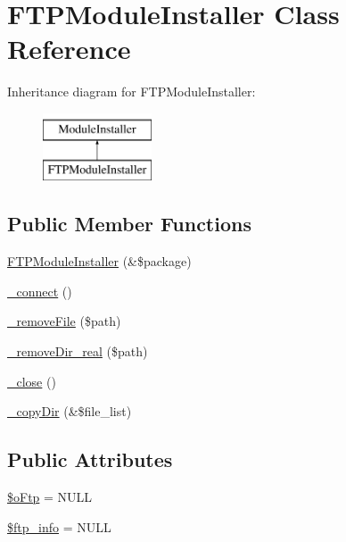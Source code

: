 \hypertarget{classFTPModuleInstaller}{\section{F\-T\-P\-Module\-Installer Class Reference}
\label{classFTPModuleInstaller}
}
Inheritance diagram for F\-T\-P\-Module\-Installer\-:\begin{figure}[H]
\begin{center}
\leavevmode
\includegraphics[height=2.000000cm]{classFTPModuleInstaller}
\end{center}
\end{figure}
\subsection*{Public Member Functions}
\begin{DoxyCompactItemize}
\item 
\hyperlink{classFTPModuleInstaller_a77174bd1ad449c30c7f74333921441d6}{F\-T\-P\-Module\-Installer} (\&\$package)
\item 
\hyperlink{classFTPModuleInstaller_af6dd02408c44cc5e3903e7a8d195314b}{\-\_\-connect} ()
\item 
\hyperlink{classFTPModuleInstaller_a97578f8c7903aded9a0141b1d378713b}{\-\_\-remove\-File} (\$path)
\item 
\hyperlink{classFTPModuleInstaller_a069e2b098a7b06dfcf65bedf41c0fa0c}{\-\_\-remove\-Dir\-\_\-real} (\$path)
\item 
\hyperlink{classFTPModuleInstaller_a283ea106c86af1ab83e97ae852d07f57}{\-\_\-close} ()
\item 
\hyperlink{classFTPModuleInstaller_a48e7b724a4daa35a71163855add13532}{\-\_\-copy\-Dir} (\&\$file\-\_\-list)
\end{DoxyCompactItemize}
\subsection*{Public Attributes}
\begin{DoxyCompactItemize}
\item 
\hyperlink{classFTPModuleInstaller_a7df6cf65240fbb39a7d763e10b236dc9}{\$o\-Ftp} = N\-U\-L\-L
\item 
\hyperlink{classFTPModuleInstaller_afd92e3672f27df9d0056f759cfb4206c}{\$ftp\-\_\-info} = N\-U\-L\-L
\end{DoxyCompactItemize}


